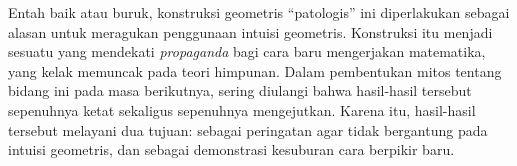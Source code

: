 \documentclass[../../../include/open-logic-section]{subfiles}
\begin{document}
Entah baik atau buruk, konstruksi geometris ``patologis'' ini diperlakukan
sebagai alasan untuk meragukan penggunaan intuisi geometris. Konstruksi itu
menjadi sesuatu yang mendekati \emph{propaganda} bagi cara baru mengerjakan
matematika, yang kelak memuncak pada teori himpunan. Dalam pembentukan mitos
tentang bidang ini pada masa berikutnya, sering diulangi bahwa hasil-hasil
tersebut sepenuhnya ketat sekaligus sepenuhnya mengejutkan. Karena itu,
hasil-hasil tersebut melayani dua tujuan: sebagai peringatan agar tidak
bergantung pada intuisi geometris, dan sebagai demonstrasi kesuburan cara
berpikir baru.
\end{document}
